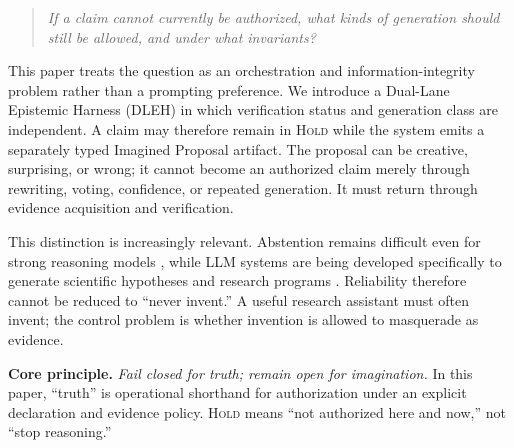 \documentclass[10pt,twocolumn]{article}
\begin{document}
\begin{quote}
\emph{If a claim cannot currently be authorized, what kinds of generation should still be allowed, and under what invariants?}
\end{quote}

This paper treats the question as an orchestration and information-integrity problem rather than a prompting preference. We introduce a Dual-Lane Epistemic Harness (DLEH) in which verification status and generation class are independent. A claim may therefore remain in \textsc{Hold} while the system emits a separately typed Imagined Proposal artifact. The proposal can be creative, surprising, or wrong; it cannot become an authorized claim merely through rewriting, voting, confidence, or repeated generation. It must return through evidence acquisition and verification.

This distinction is increasingly relevant. Abstention remains difficult even for strong reasoning models \cite{madhusudhan2025llms,kirichenko2025abstentionbench}, while LLM systems are being developed specifically to generate scientific hypotheses and research programs \cite{lu2024aiscientist,gottweis2025aicoscientist,alkan2025survey,xiong2025reliable,zhang2025exploring}. Reliability therefore cannot be reduced to ``never invent.'' A useful research assistant must often invent; the control problem is whether invention is allowed to masquerade as evidence.

\begin{corebox}
\textbf{Core principle.} \emph{Fail closed for truth; remain open for imagination.} In this paper, ``truth'' is operational shorthand for authorization under an explicit declaration and evidence policy. \textsc{Hold} means ``not authorized here and now,'' not ``stop reasoning.''
\end{corebox}
\end{document}
